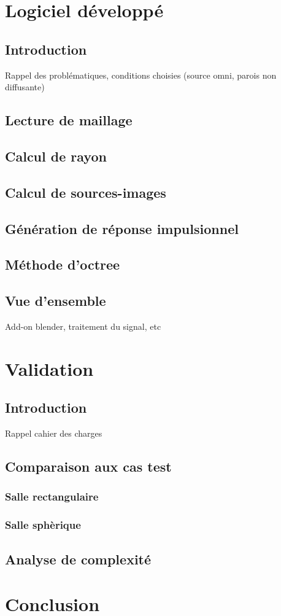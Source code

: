 	\chapter{Logiciel développé}
		\minitoc
		\newpage
		\section{Introduction}
		Rappel des problématiques, conditions choisies (source omni, parois non diffusante)
		\section{Lecture de maillage}
		\section{Calcul de rayon}
		\section{Calcul de sources-images}
		\section{Génération de réponse impulsionnel}
		\section{Méthode d'octree}
		\section{Vue d'ensemble}
		Add-on blender, traitement du signal, etc

	\chapter{Validation}
		\minitoc
		\newpage
		\section{Introduction}
		Rappel cahier des charges
		\section{Comparaison aux cas test}
			\subsection{Salle rectangulaire}
			\subsection{Salle sphèrique}
		\section{Analyse de complexité}
		
	\chapter*{Conclusion}
		\newpage
		
 
 
